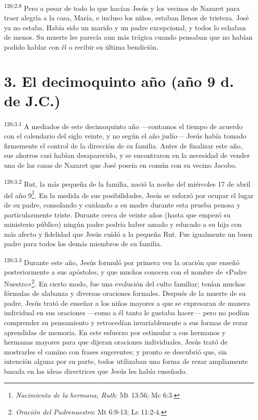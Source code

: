 \par 
\textsuperscript{126:2.8} Pero a pesar de todo lo que hacían Jesús y los vecinos de Nazaret para traer alegría a la casa, María, e incluso los niños, estaban llenos de tristeza. José ya no estaba. Había sido un marido y un padre excepcional, y todos lo echaban de menos. Su muerte les parecía aun más trágica cuando pensaban que no habían podido hablar con él o recibir su última bendición.

\section*{3. El decimoquinto año (año 9 d. de J.C.)}
\par 
\textsuperscript{126:3.1} A mediados de este decimoquinto año ---contamos el tiempo de acuerdo con el calendario del siglo veinte, y no según el año judío--- Jesús había tomado firmemente el control de la dirección de su familia. Antes de finalizar este año, sus ahorros casi habían desaparecido, y se encontraron en la necesidad de vender una de las casas de Nazaret que José poseía en común con su vecino Jacobo.

\par 
\textsuperscript{126:3.2} Rut, la más pequeña de la familia, nació la noche del miércoles 17 de abril del año 9\footnote{\textit{Nacimiento de la hermana, Ruth}: Mt 13:56; Mc 6:3.}. En la medida de sus posibilidades, Jesús se esforzó por ocupar el lugar de su padre, consolando y cuidando a su madre durante esta prueba penosa y particularmente triste. Durante cerca de veinte años (hasta que empezó su ministerio público) ningún padre podría haber amado y educado a su hija con más afecto y fidelidad que Jesús cuidó a la pequeña Rut. Fue igualmente un buen padre para todos los demás miembros de su familia.

\par 
\textsuperscript{126:3.3} Durante este año, Jesús formuló por primera vez la oración que enseñó posteriormente a sus apóstoles, y que muchos conocen con el nombre de «Padre Nuestro»\footnote{\textit{Oración del Padrenuestro}: Mt 6:9-13; Lc 11:2-4.}. En cierto modo, fue una evolución del culto familiar; tenían muchas fórmulas de alabanza y diversas oraciones formales. Después de la muerte de su padre, Jesús trató de enseñar a los niños mayores a que se expresaran de manera individual en sus oraciones ---como a él tanto le gustaba hacer--- pero no podían comprender su pensamiento y retrocedían invariablemente a sus formas de rezar aprendidas de memoria. En este esfuerzo por estimular a sus hermanos y hermanas mayores para que dijeran oraciones individuales, Jesús trató de mostrarles el camino con frases sugerentes; y pronto se descubrió que, sin intención alguna por su parte, todos utilizaban una forma de rezar ampliamente basada en las ideas directrices que Jesús les había enseñado.

